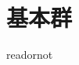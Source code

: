 \documentclass{jsarticle}
\begin{document}
\fi

\section{基本群}

\expandafter\ifx\csname readornot\endcsname\relax
  
\end{document}
